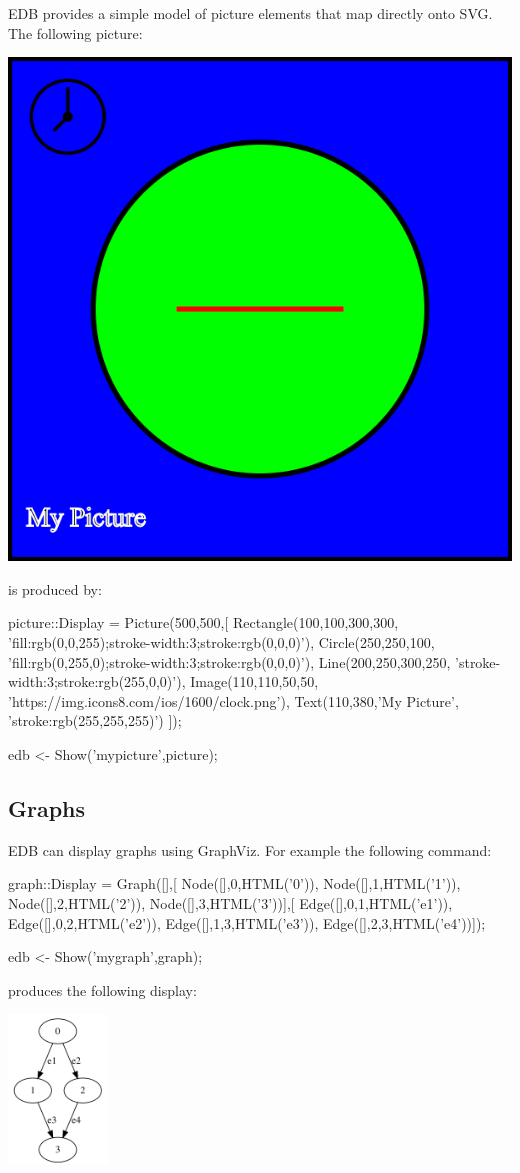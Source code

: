 \documentclass[5p,times]{elsarticle}
\begin{document}
EDB provides a simple model of picture elements that map directly onto SVG. The following picture:
\begin{center}
\includegraphics[width=0.6\columnwidth]{picture}
\end{center}
is produced by:
\begin{ESL}
picture::Display = Picture(500,500,[
  Rectangle(100,100,300,300,
    'fill:rgb(0,0,255);stroke-width:3;stroke:rgb(0,0,0)'),
  Circle(250,250,100,
    'fill:rgb(0,255,0);stroke-width:3;stroke:rgb(0,0,0)'),
  Line(200,250,300,250,
    'stroke-width:3;stroke:rgb(255,0,0)'),
  Image(110,110,50,50,
    'https://img.icons8.com/ios/1600/clock.png'),
  Text(110,380,'My Picture',
    'stroke:rgb(255,255,255)')
]);

edb <- Show('mypicture',picture);
\end{ESL}

\subsection{Graphs}

\label{sec:graphs}

EDB can display graphs using GraphViz. For example the following command:
\begin{ESL}
graph::Display = Graph([],[
  Node([],0,HTML('0')),
  Node([],1,HTML('1')),
  Node([],2,HTML('2')),
  Node([],3,HTML('3'))],[
  Edge([],0,1,HTML('e1')),
  Edge([],0,2,HTML('e2')),
  Edge([],1,3,HTML('e3')),
  Edge([],2,3,HTML('e4'))]);
  
edb <- Show('mygraph',graph);
\end{ESL}
produces the following display:
\begin{center}
\includegraphics[height=4cm]{example_graph}
\end{center}
\end{document}

